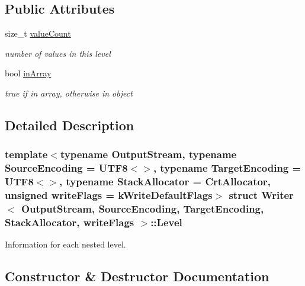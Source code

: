 \subsection*{Public Attributes}
\begin{DoxyCompactItemize}
\item 
size\+\_\+t \hyperlink{structWriter_1_1Level_a4a09e5fda49d0d57b2adc041203f244f}{value\+Count}
\begin{DoxyCompactList}\small\item\em number of values in this level \end{DoxyCompactList}\item 
bool \hyperlink{structWriter_1_1Level_aa009a2d675e98757c2997072aad78789}{in\+Array}
\begin{DoxyCompactList}\small\item\em true if in array, otherwise in object \end{DoxyCompactList}\end{DoxyCompactItemize}


\subsection{Detailed Description}
\subsubsection*{template$<$typename Output\+Stream, typename Source\+Encoding = U\+T\+F8$<$$>$, typename Target\+Encoding = U\+T\+F8$<$$>$, typename Stack\+Allocator = Crt\+Allocator, unsigned write\+Flags = k\+Write\+Default\+Flags$>$\newline
struct Writer$<$ Output\+Stream, Source\+Encoding, Target\+Encoding, Stack\+Allocator, write\+Flags $>$\+::\+Level}

Information for each nested level. 

\subsection{Constructor \& Destructor Documentation}
\mbox{\label{structWriter_1_1Level_a0b1844a7a1b7c6c20e1964dbb67da484}} 
